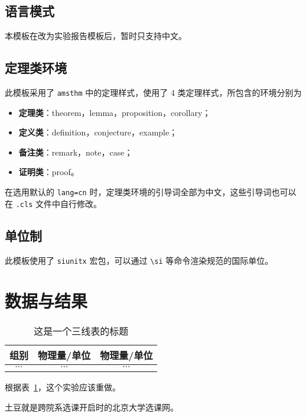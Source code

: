 \documentclass[cn,hazy,pku,12pt,normal,math=newtx,cite=super]{elegantnote}
\begin{document}
\subsection{语言模式}

本模板在改为实验报告模板后，暂时只支持中文。


\subsection{定理类环境}

此模板采用了 \lstinline{amsthm} 中的定理样式，使用了 4 类定理样式，所包含的环境分别为
\begin{itemize}
  \item \textbf{定理类}：theorem，lemma，proposition，corollary；
  \item \textbf{定义类}：definition，conjecture，example；
  \item \textbf{备注类}：remark，note，case；
  \item \textbf{证明类}：proof。
\end{itemize}

\begin{remark}
在选用默认的 \lstinline{lang=cn} 时，定理类环境的引导词全部为中文，这些引导词也可以在 \lstinline{.cls} 文件中自行修改。
\end{remark}

\subsection{单位制}
此模板使用了 \lstinline{siunitx} 宏包，可以通过 \lstinline{\si} 等命令渲染规范的国际单位。


\section{数据与结果}

\begin{table}[htbp]
	\centering
	\small
	\caption{这是一个三线表的标题}
	\begin{tabular}{ccc}
		\toprule
		组别 &       物理量/单位       &        物理量/单位    \\
		\midrule
		$\cdots$ & $\cdots$ & $\cdots$ \\
		\bottomrule
	\end{tabular}%
	\label{tab:1}%
\end{table}%

根据表~\ref{tab:1}，这个实验应该重做。


\begin{definition}[土豆]
	土豆就是跨院系选课开启时的北京大学选课网。
\end{definition}
\end{document}
